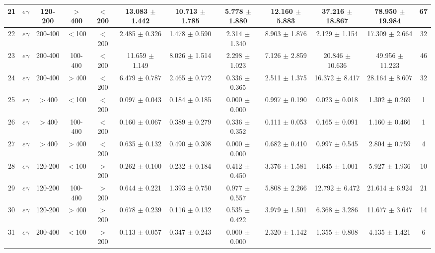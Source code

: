 \documentclass[thesis.tex]{subfiles}
\renewcommand\_{\textunderscore\allowbreak}
\begin{document}
\begin{table}[hbtp]
{\begin{tabular}{|c|c|c|c|c|c|c|c|c|c||c|c|}
 21&  $e\gamma$     & 120-200 & $>$400  & $<$200  &    13.083 $\pm$ 1.442  &  10.713 $\pm$ 1.785 &   5.778 $\pm$ 1.880  &  12.160 $\pm$  5.883 &  37.216 $\pm$ 18.867 &  78.950 $\pm$  19.984  &  67\\ \hline
 22&  $e\gamma$     & 200-400 & $<$100  & $<$200  &     2.485 $\pm$ 0.326  &   1.478 $\pm$ 0.590 &   2.314 $\pm$ 1.340  &   8.903 $\pm$  1.876 &   2.129 $\pm$  1.154 &  17.309 $\pm$   2.664  &  32\\ \hline
 23&  $e\gamma$     & 200-400 & 100-400 & $<$200  &    11.659 $\pm$ 1.149  &   8.026 $\pm$ 1.514 &   2.298 $\pm$ 1.023  &   7.126 $\pm$  2.859 &  20.846 $\pm$ 10.636 &  49.956 $\pm$  11.223  &  46\\ \hline
 24&  $e\gamma$     & 200-400 & $>$400  & $<$200  &     6.479 $\pm$ 0.787  &   2.465 $\pm$ 0.772 &   0.336 $\pm$ 0.365  &   2.511 $\pm$  1.375 &  16.372 $\pm$  8.417 &  28.164 $\pm$   8.607  &  32\\ \hline
 25&  $e\gamma$     & $>$400 & $<$100   & $<$200  &     0.097 $\pm$ 0.043  &   0.184 $\pm$ 0.185 &   0.000 $\pm$ 0.000  &   0.997 $\pm$  0.190 &   0.023 $\pm$  0.018 &   1.302 $\pm$   0.269  &   1\\ \hline
 26&  $e\gamma$     & $>$400 & 100-400  & $<$200  &     0.160 $\pm$ 0.067  &   0.389 $\pm$ 0.279 &   0.336 $\pm$ 0.352  &   0.111 $\pm$  0.053 &   0.165 $\pm$  0.091 &   1.160 $\pm$   0.466  &   1\\ \hline
 27&  $e\gamma$     & $>$400 & $>$400   & $<$200  &     0.635 $\pm$ 0.132  &   0.490 $\pm$ 0.308 &   0.000 $\pm$ 0.000  &   0.682 $\pm$  0.410 &   0.997 $\pm$  0.545 &   2.804 $\pm$   0.759  &   4\\ \hline
 28&  $e\gamma$     & 120-200 & $<$100  & $>$200  &     0.262 $\pm$ 0.100  &   0.232 $\pm$ 0.184 &   0.412 $\pm$ 0.450  &   3.376 $\pm$  1.581 &   1.645 $\pm$  1.001 &   5.927 $\pm$   1.936  &  10\\ \hline
 29&  $e\gamma$     & 120-200 & 100-400 & $>$200  &     0.644 $\pm$ 0.221  &   1.393 $\pm$ 0.750 &   0.977 $\pm$ 0.557  &   5.808 $\pm$  2.266 &  12.792 $\pm$  6.472 &  21.614 $\pm$   6.924  &  21\\ \hline
 30&  $e\gamma$     & 120-200 & $>$400  & $>$200  &     0.678 $\pm$ 0.239  &   0.116 $\pm$ 0.132 &   0.535 $\pm$ 0.422  &   3.979 $\pm$  1.501 &   6.368 $\pm$  3.286 &  11.677 $\pm$   3.647  &  14\\ \hline
 31&  $e\gamma$     & 200-400 & $<$100  & $>$200  &     0.113 $\pm$ 0.057  &   0.347 $\pm$ 0.243 &   0.000 $\pm$ 0.000  &   2.320 $\pm$  1.142 &   1.355 $\pm$  0.808 &   4.135 $\pm$   1.421  &   6\\ \hline

\end{tabular}}
\end{table}
\end{document}
